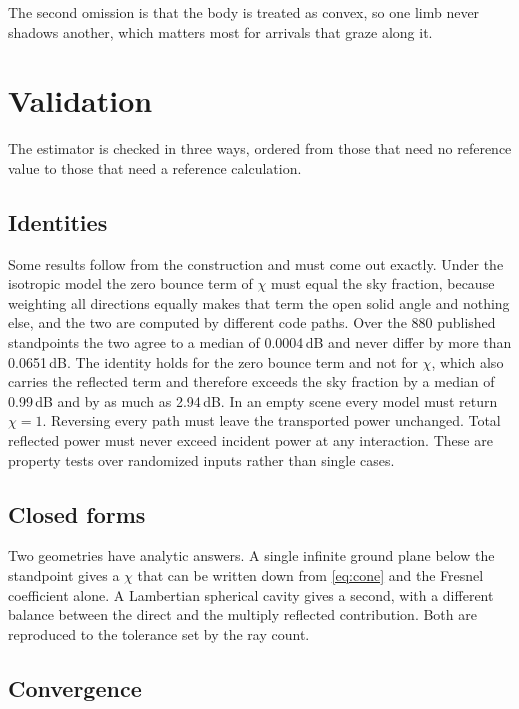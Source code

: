 The second omission is that the body is treated as convex, so one limb never
shadows another, which matters most for arrivals that graze along it.

\section{Validation}
\label{sec:valid}

The estimator is checked in three ways, ordered from those that need no
reference value to those that need a reference calculation.

\subsection{Identities}

Some results follow from the construction and must come out exactly. Under the
isotropic model the zero bounce term of $\chi$ must equal the sky fraction,
because weighting all directions equally makes that term the open solid angle
and nothing else, and the two are computed by different code paths. Over the 880
published standpoints the two agree to a median of 0.0004\,dB and never differ
by more than 0.0651\,dB. The identity holds for the zero bounce term and not for
$\chi$, which also carries the reflected term and therefore exceeds the sky
fraction by a median of 0.99\,dB and by as much as 2.94\,dB. In an empty scene
every model must return $\chi = 1$. Reversing every path must leave the
transported power unchanged. Total reflected power must never exceed incident
power at any interaction. These are property tests over randomized inputs rather
than single cases.

\subsection{Closed forms}

Two geometries have analytic answers. A single infinite ground plane below the
standpoint gives a $\chi$ that can be written down from \eqref{eq:cone} and the
Fresnel coefficient alone. A Lambertian spherical cavity gives a second, with a
different balance between the direct and the multiply reflected contribution.
Both are reproduced to the tolerance set by the ray count.

\subsection{Convergence}

